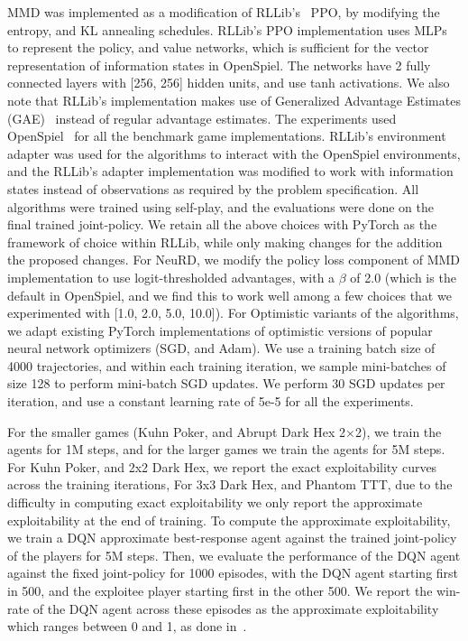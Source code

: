 MMD was implemented as a modification of RLLib's~\cite{liangRLlib2018} PPO, by modifying the
entropy, and KL annealing schedules.
RLLib's PPO implementation uses MLPs to represent the policy, and value networks, which is
sufficient for the vector representation of information states in OpenSpiel.
The networks have 2 fully connected layers with [256, 256] hidden units, and use tanh activations.
We also note that RLLib's implementation makes use of Generalized Advantage Estimates
(GAE)~\cite{schulmanHighDimensional2018} instead of regular advantage estimates.
The experiments used OpenSpiel~\cite{lanctotOpenSpiel2020} for all the benchmark game
implementations.
RLLib's environment adapter was used for the algorithms to interact with the OpenSpiel
environments, and the RLLib's adapter implementation was modified to work with information states
instead of observations as required by the problem specification.
All algorithms were trained using self-play, and the evaluations were done on the final trained
joint-policy.
We retain all the above choices with PyTorch as the framework of choice within RLLib, while only
making changes for the addition the proposed changes.
For NeuRD, we modify the policy loss component of MMD implementation to use logit-thresholded
advantages, with a $\beta$ of 2.0 (which is the default in OpenSpiel, and we find this to work well
among a few choices that we experimented with [1.0, 2.0, 5.0, 10.0]).
For Optimistic variants of the algorithms, we adapt existing PyTorch implementations of optimistic
versions of popular neural network optimizers (SGD, and Adam).
We use a training batch size of 4000 trajectories, and within each training iteration, we sample
mini-batches of size 128 to perform mini-batch SGD updates.
We perform 30 SGD updates per iteration, and use a constant learning rate of 5e-5 for all the
experiments.

For the smaller games (Kuhn Poker, and Abrupt Dark Hex 2$\times$2), we train the agents for 1M
steps, and for the larger games we train the agents for 5M steps.
For Kuhn Poker, and 2x2 Dark Hex, we report the exact exploitability curves across the training
iterations, For 3x3 Dark Hex, and Phantom TTT, due to the difficulty in computing exact
exploitability we only report the approximate exploitability at the end of training.
To compute the approximate exploitability, we train a DQN approximate best-response agent against
the trained joint-policy of the players for 5M steps.
Then, we evaluate the performance of the DQN agent against the fixed joint-policy for 1000
episodes, with the DQN agent starting first in 500, and the exploitee player starting first in the
other 500.
We report the win-rate of the DQN agent across these episodes as the approximate exploitability
which ranges between 0 and 1, as done in~\cite{sokotaUnified2023}.

